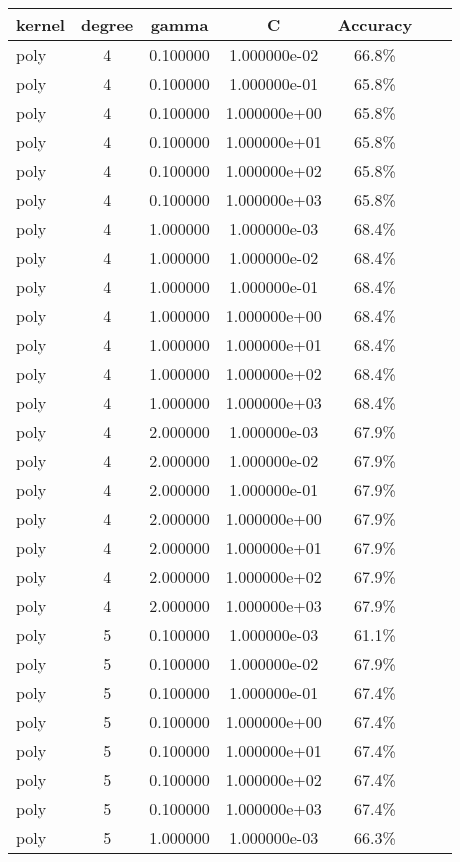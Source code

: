 \documentclass[11pt,spanish,listoffigures,listoftables]{tfgetsinf}
\begin{document}
\begin{table}
 \begin{tabular}{l*{5}{c}r}
 kernel & degree & gamma & C & Accuracy\\
 \hline
 poly & 4 & 0.100000 & 1.000000e-02 & 66.8\%\\
 poly & 4 & 0.100000 & 1.000000e-01 & 65.8\%\\
 poly & 4 & 0.100000 & 1.000000e+00 & 65.8\%\\
 poly & 4 & 0.100000 & 1.000000e+01 & 65.8\%\\
 poly & 4 & 0.100000 & 1.000000e+02 & 65.8\%\\
 poly & 4 & 0.100000 & 1.000000e+03 & 65.8\%\\
 poly & 4 & 1.000000 & 1.000000e-03 & 68.4\%\\
 poly & 4 & 1.000000 & 1.000000e-02 & 68.4\%\\
 poly & 4 & 1.000000 & 1.000000e-01 & 68.4\%\\
 poly & 4 & 1.000000 & 1.000000e+00 & 68.4\%\\
 poly & 4 & 1.000000 & 1.000000e+01 & 68.4\%\\
 poly & 4 & 1.000000 & 1.000000e+02 & 68.4\%\\
 poly & 4 & 1.000000 & 1.000000e+03 & 68.4\%\\
 poly & 4 & 2.000000 & 1.000000e-03 & 67.9\%\\
 poly & 4 & 2.000000 & 1.000000e-02 & 67.9\%\\
 poly & 4 & 2.000000 & 1.000000e-01 & 67.9\%\\
 poly & 4 & 2.000000 & 1.000000e+00 & 67.9\%\\
 poly & 4 & 2.000000 & 1.000000e+01 & 67.9\%\\
 poly & 4 & 2.000000 & 1.000000e+02 & 67.9\%\\
 poly & 4 & 2.000000 & 1.000000e+03 & 67.9\%\\
 poly & 5 & 0.100000 & 1.000000e-03 & 61.1\%\\
 poly & 5 & 0.100000 & 1.000000e-02 & 67.9\%\\
 poly & 5 & 0.100000 & 1.000000e-01 & 67.4\%\\
 poly & 5 & 0.100000 & 1.000000e+00 & 67.4\%\\
 poly & 5 & 0.100000 & 1.000000e+01 & 67.4\%\\
 poly & 5 & 0.100000 & 1.000000e+02 & 67.4\%\\
 poly & 5 & 0.100000 & 1.000000e+03 & 67.4\%\\
 poly & 5 & 1.000000 & 1.000000e-03 & 66.3\%\\

\end{tabular}
\end{table}
\end{document}
